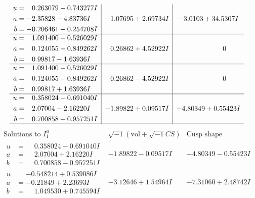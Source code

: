 \documentclass[1p]{elsarticle_modified}
\theoremstyle{definition}
\newcommand{\I}{\sqrt{-1}}
\begin{document}
$$\begin{array}{c|c|c}
\begin{aligned}
u &= \phantom{-}0.263079 - 0.743277 I \\
a &= -2.35828 - 4.83736 I \\
b &= -0.206461 + 0.254708 I\end{aligned}
 & -1.07695 + 2.69734 I & -3.0103 + 34.5307 I \\ \hline\begin{aligned}
u &= \phantom{-}1.091400 + 0.526029 I \\
a &= \phantom{-}0.124055 - 0.849262 I \\
b &= \phantom{-}0.99817 - 1.63936 I\end{aligned}
 & \phantom{-}0.26862 + 4.52922 I & \phantom{-0.000000 } 0 \\ \hline\begin{aligned}
u &= \phantom{-}1.091400 - 0.526029 I \\
a &= \phantom{-}0.124055 + 0.849262 I \\
b &= \phantom{-}0.99817 + 1.63936 I\end{aligned}
 & \phantom{-}0.26862 - 4.52922 I & \phantom{-0.000000 } 0 \\ \hline\begin{aligned}
u &= \phantom{-}0.358024 + 0.691040 I \\
a &= \phantom{-}2.07004 - 2.16220 I \\
b &= \phantom{-}0.700858 + 0.957251 I\end{aligned}
 & -1.89822 + 0.09517 I & -4.80349 + 0.55423 I\\
 \hline 
 \end{array}$$\newpage$$\begin{array}{c|c|c}  
\text{Solutions to }I^u_{1}& \I (\text{vol} + \sqrt{-1}CS) & \text{Cusp shape}\\
 \hline 
\begin{aligned}
u &= \phantom{-}0.358024 - 0.691040 I \\
a &= \phantom{-}2.07004 + 2.16220 I \\
b &= \phantom{-}0.700858 - 0.957251 I\end{aligned}
 & -1.89822 - 0.09517 I & -4.80349 - 0.55423 I \\ \hline\begin{aligned}
u &= -0.548214 + 0.539086 I \\
a &= -0.21849 + 2.23693 I \\
b &= \phantom{-}1.049530 + 0.745594 I\end{aligned}
 & -3.12646 + 1.54964 I & -7.31060 + 2.48742 I \\ \hline\begin{aligned}

\end{aligned}
\end{array}$$
\end{document}
